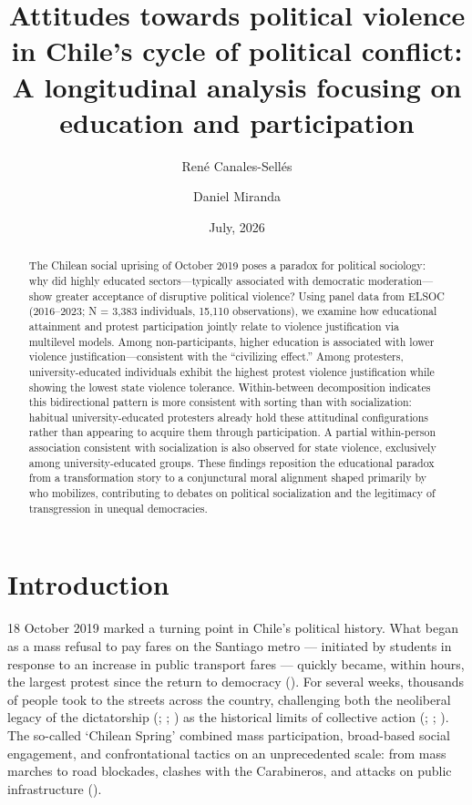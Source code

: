 \documentclass[
  13pt,
]{article}
\title{Attitudes towards political violence in Chile's cycle of
political conflict: A longitudinal analysis focusing on education and
participation}
\author{René Canales-Sellés}
\affil{%
                  Bremen International Graduate School of Social
                  Sciences, University of Bremen
              }
\author{Daniel Miranda}
\affil{%
                  Department of Psychology, University of Chile
              }
\date{July, 2026}
\begin{document}
\maketitle
\begin{abstract}
The Chilean social uprising of October 2019 poses a paradox for
political sociology: why did highly educated sectors---typically
associated with democratic moderation---show greater acceptance of
disruptive political violence? Using panel data from ELSOC (2016--2023;
N = 3,383 individuals, 15,110 observations), we examine how educational
attainment and protest participation jointly relate to violence
justification via multilevel models. Among non-participants, higher
education is associated with lower violence justification---consistent
with the ``civilizing effect.'' Among protesters, university-educated
individuals exhibit the highest protest violence justification while
showing the lowest state violence tolerance. Within-between
decomposition indicates this bidirectional pattern is more consistent
with sorting than with socialization: habitual university-educated
protesters already hold these attitudinal configurations rather than
appearing to acquire them through participation. A partial within-person
association consistent with socialization is also observed for state
violence, exclusively among university-educated groups. These findings
reposition the educational paradox from a transformation story to a
conjunctural moral alignment shaped primarily by who mobilizes,
contributing to debates on political socialization and the legitimacy of
transgression in unequal democracies.
\end{abstract}


\section{Introduction}\label{introduction}

18 October 2019 marked a turning point in Chile's political history.
What began as a mass refusal to pay fares on the Santiago metro ---
initiated by students in response to an increase in public transport
fares --- quickly became, within hours, the largest protest since the
return to democracy ().
For several weeks, thousands of people took to the streets across the
country, challenging both the neoliberal legacy of the dictatorship
(;
;
) as the historical
limits of collective action (; ;
). The so-called
`Chilean Spring' combined mass participation, broad-based social
engagement, and confrontational tactics on an unprecedented scale: from
mass marches to road blockades, clashes with the Carabineros, and
attacks on public infrastructure
().
\end{document}
